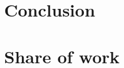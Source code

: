 \documentclass[11pt]{article}
\begin{document}
\section{Conclusion}


% 
\section{Share of work}
% 
% 



\end{document}
